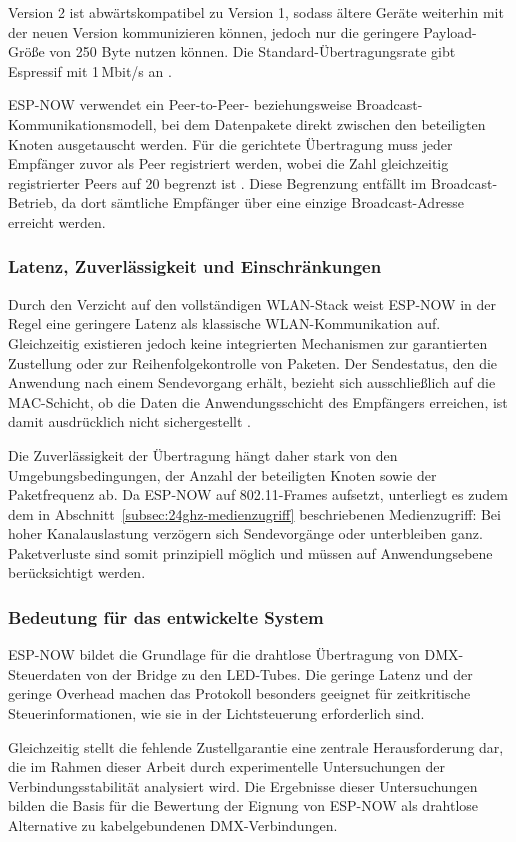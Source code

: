 Version 2 ist abwärtskompatibel zu Version 1, sodass ältere Geräte weiterhin mit der neuen Version kommunizieren können, 
jedoch nur die geringere Payload-Größe von 250 Byte nutzen können.
Die Standard-Übertragungsrate gibt Espressif mit 1\,Mbit/s an \cite{espressif_espnow}.

ESP-NOW verwendet ein Peer-to-Peer- beziehungsweise Broadcast-Kommunikationsmodell, bei
dem Datenpakete direkt zwischen den beteiligten Knoten ausgetauscht werden. Für die
gerichtete Übertragung muss jeder Empfänger zuvor als Peer registriert werden, wobei die
Zahl gleichzeitig registrierter Peers auf 20 begrenzt ist \cite{espressif_espnow}. Diese
Begrenzung entfällt im Broadcast-Betrieb, da dort sämtliche Empfänger über eine einzige
Broadcast-Adresse erreicht werden.

\subsubsection{Latenz, Zuverlässigkeit und Einschränkungen}
\label{subsubsec:espnow-eigenschaften}

Durch den Verzicht auf den vollständigen WLAN-Stack weist ESP-NOW in der Regel eine
geringere Latenz als klassische WLAN-Kommunikation auf. Gleichzeitig existieren jedoch
keine integrierten Mechanismen zur garantierten Zustellung oder zur Reihenfolgekontrolle
von Paketen. Der Sendestatus, den die Anwendung nach einem Sendevorgang erhält, bezieht
sich ausschließlich auf die MAC-Schicht, ob die Daten die Anwendungsschicht des
Empfängers erreichen, ist damit ausdrücklich nicht sichergestellt
\cite{espressif_espnow}.

Die Zuverlässigkeit der Übertragung hängt daher stark von den Umgebungsbedingungen, der
Anzahl der beteiligten Knoten sowie der Paketfrequenz ab. Da ESP-NOW auf 802.11-Frames
aufsetzt, unterliegt es zudem dem in
Abschnitt~\ref{subsec:24ghz-medienzugriff} beschriebenen Medienzugriff: Bei hoher
Kanalauslastung verzögern sich Sendevorgänge oder unterbleiben ganz. Paketverluste sind
somit prinzipiell möglich und müssen auf Anwendungsebene berücksichtigt werden.

\subsubsection{Bedeutung für das entwickelte System}
\label{subsubsec:espnow-system}

ESP-NOW bildet die Grundlage für die drahtlose Übertragung von DMX-Steuerdaten von der
Bridge zu den LED-Tubes. Die geringe Latenz und der geringe Overhead machen das
Protokoll besonders geeignet für zeitkritische Steuerinformationen, wie sie in der
Lichtsteuerung erforderlich sind.

Gleichzeitig stellt die fehlende Zustellgarantie eine zentrale Herausforderung dar, die
im Rahmen dieser Arbeit durch experimentelle Untersuchungen der Verbindungsstabilität
analysiert wird. Die Ergebnisse dieser Untersuchungen bilden die Basis für die Bewertung
der Eignung von ESP-NOW als drahtlose Alternative zu kabelgebundenen DMX-Verbindungen.
